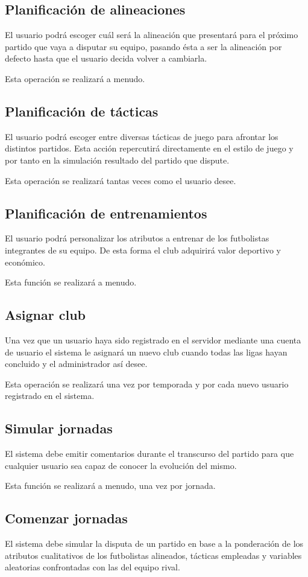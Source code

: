 \subsection*{Planificación de alineaciones}
El usuario podrá escoger cuál será la alineación que presentará para el próximo
partido que vaya a disputar su equipo, pasando ésta a ser la alineación por
defecto hasta que el usuario decida volver a cambiarla.

Esta operación se realizará a menudo.
\subsection*{Planificación de tácticas}
El usuario podrá escoger entre diversas tácticas de juego para afrontar los
distintos partidos. Esta acción repercutirá directamente en el estilo de juego y
por tanto en la simulación resultado del partido que dispute.

Esta operación se realizará tantas veces como el usuario desee.
\subsection*{Planificación de entrenamientos}
El usuario podrá personalizar los atributos a entrenar de los futbolistas
integrantes de su equipo. De esta forma el club adquirirá valor deportivo y
económico.

Esta función se realizará a menudo.

\subsection*{Asignar club}
Una vez que un usuario haya sido registrado en el servidor mediante una cuenta
de usuario el sistema le asignará un nuevo club cuando todas las ligas hayan
concluido y el administrador así desee.

Esta operación se realizará una vez por temporada y por cada nuevo usuario
registrado en el sistema.

\subsection*{Simular jornadas}
El sistema debe emitir comentarios durante el transcurso del partido para que
cualquier usuario sea capaz de conocer la evolución del mismo.

Esta función se realizará a menudo, una vez por jornada.

\subsection*{Comenzar jornadas}
El sistema debe simular la disputa de un partido en base a la ponderación de los
atributos cualitativos de los futbolistas alineados, tácticas empleadas y
variables aleatorias confrontadas con las del equipo rival.

